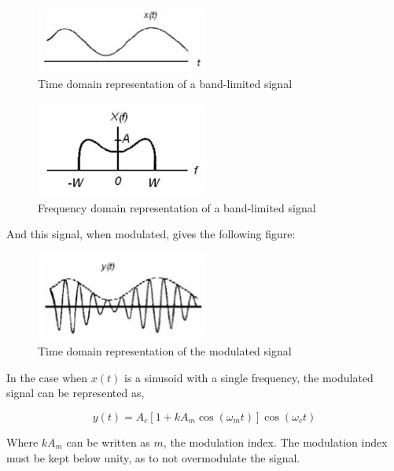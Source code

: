 \begin{figure}[H]
    \centering
    \includegraphics[width=0.5\textwidth]{images/intro_bandlimited_signal_time.png}
    \caption{Time domain representation of a band-limited signal}
    \label{fig:intro_bandlimited_signal_time}
\end{figure}
\begin{figure}[H]
    \centering
    \includegraphics[width=0.5\textwidth]{images/intro_bandlimited_signal.png}
    \caption{Frequency domain representation of a band-limited signal}
    \label{fig:intro_bandlimited_signal_freq}
\end{figure}

And this signal, when modulated, gives the following figure:
\begin{figure}[H]
    \centering
    \includegraphics[width=0.5\textwidth]{images/intro_modulated_signal.png}
    \caption{Time domain representation of the modulated signal}
    \label{fig:intro_modulated_signal}
\end{figure}

In the case when $x(t)$ is a sinusoid with a single frequency, the modulated signal can be represented as,

\begin{equation}
    y(t) = A_c\left[1 + kA_m\cos(\omega_mt)\right]\cos(\omega_ct)
\end{equation}

Where $kA_m$ can be written as $m$, the modulation index. The modulation index must be kept below unity, as to not overmodulate the signal.

